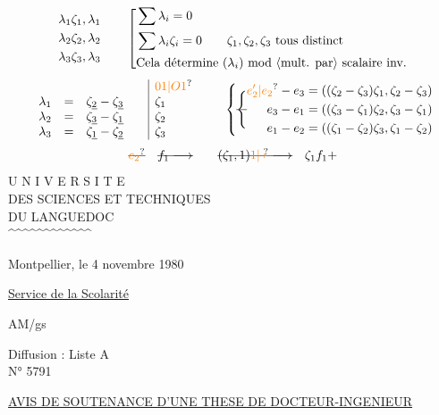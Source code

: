 \[
 \begin{aligned}&\lambda_1\zeta_1,\lambda_1\\&\lambda_2\zeta_2,\lambda_2\\&\lambda_3\zeta_3,\lambda_3\end{aligned}
 \qquad\left[\begin{aligned}
 &\sum\lambda_i=0\\ &\sum\lambda_i\zeta_i=0\qquad \zeta_1,\zeta_2,\zeta_3\ \text{tous distinct}\\
 &\text{Cela détermine }(\lambda_i)\text{ mod }\inserted{\text{mult. par}}\text{ scalaire inv.}
 \end{aligned}\right.
\]
\[
 \begin{array}{rcl@{\qquad}|l}
 &&&\multicolumn{1}{l}{\unsure{01|O1}}\\
 \lambda_1&=&\zeta_{\underline2}-\zeta_{\underline3}&\zeta_1\\
 \lambda_2&=&\zeta_{\underline3}-\zeta_{\underline1}&\zeta_2\\
 \lambda_3&=&\zeta_{\underline1}-\zeta_{\underline2}&\zeta_3
 \end{array}
 \qquad\left\{\deleted{\Bigg\{}
 \begin{aligned}
 \unsure{e'_2|e_2}-e_3&=((\zeta_2-\zeta_3)\zeta_1,\zeta_2-\zeta_3)\\
 e_3-e_1&=((\zeta_3-\zeta_1)\zeta_2,\zeta_3-\zeta_1)\\
 e_1-e_2&=((\zeta_1-\zeta_2)\zeta_3,\zeta_1-\zeta_2)
 \end{aligned}\right.
\]
\[
 \deleted{\unsure{e_2}}\quad \deleted{f_1\longrightarrow}\qquad
 \deleted{(\zeta_1,1)\unsure{1|\mapstochar}\longrightarrow}\quad\zeta_1f_1+
\]
U N I V E R S I T E\\
DES SCIENCES ET TECHNIQUES\\
DU LANGUEDOC\\
\textasciicircum{}\textasciicircum{}\textasciicircum{}\textasciicircum{}\textasciicircum{}\textasciicircum{}\textasciicircum{}\textasciicircum{}\textasciicircum{}\textasciicircum{}\textasciicircum{}\textasciicircum{}

Montpellier, le 4 novembre 1980

\uline{Service de la Scolarité}

AM/gs

Diffusion : Liste A\\
N° 5791

\uline{AVIS DE SOUTENANCE D'UNE THESE DE DOCTEUR-INGENIEUR}

